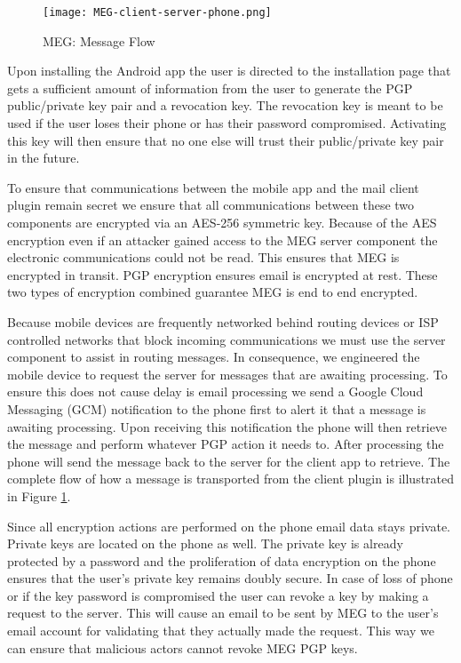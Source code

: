 \documentclass[10pt]{article}
\begin{document}
\begin{figure}[h]
    \texttt{[image: MEG-client-server-phone.png]}
    \caption{MEG: Message Flow}
    \label{fig:Flow}
\end{figure}
\begin{multicols}{2}
\par Upon installing the Android app the user is directed to the installation page that gets a sufficient amount of information from the user to generate the PGP public/private key pair and a revocation key. The revocation key is meant to be used if the user loses their phone or has their password compromised. Activating this key will then ensure that no one else will trust their public/private key pair in the future.
\par To ensure that communications between the mobile app and the mail client plugin remain secret we ensure that all communications between these two components are encrypted via an AES-256 symmetric key. Because of the AES encryption even if an attacker gained access to the MEG server component the electronic communications could not be read. This ensures that MEG is encrypted in transit. PGP encryption ensures email is encrypted at rest. These two types of encryption combined guarantee MEG is end to end encrypted.
\par Because mobile devices are frequently networked behind routing devices or ISP controlled networks that block incoming communications we must use the server component to assist in routing messages. In consequence, we engineered the mobile device to request the server for messages that are awaiting processing. To ensure this does not cause delay is email processing we send a Google Cloud Messaging (GCM) notification to the phone first to alert it that a message is awaiting processing. Upon receiving this notification the phone will then retrieve the message and perform whatever PGP action it needs to. After processing the phone will send the message back to the server for the client app to retrieve. The complete flow of how a message is transported from the client plugin is illustrated in Figure \ref{fig:Flow}.
\par Since all encryption actions are performed on the phone email data stays private. Private keys are located on the phone as well. The private key is already protected by a password and the proliferation of data encryption on the phone ensures that the user's private key remains doubly secure. In case of loss of phone or if the key password is compromised the user can revoke a key by making a request to the server. This will cause an email to be sent by MEG to the user's email account for validating that they actually made the request. This way we can ensure that malicious actors cannot revoke MEG PGP keys.
\end{multicols}
\end{document}
